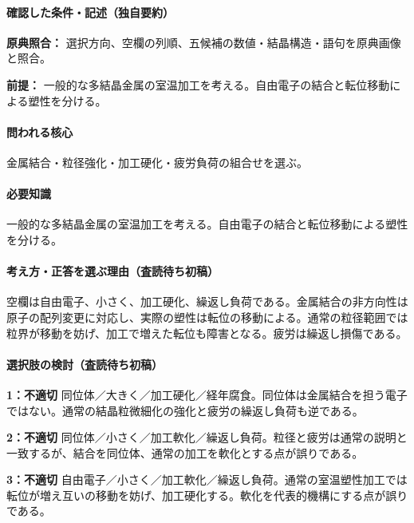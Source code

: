 \paragraph{確認した条件・記述（独自要約）}\mbox{}\par

\noindent\textbf{原典照合：} 選択方向、空欄の列順、五候補の数値・結晶構造・語句を原典画像と照合。\par

\noindent\textbf{前提：} 一般的な多結晶金属の室温加工を考える。自由電子の結合と転位移動による塑性を分ける。\par

\paragraph{問われる核心} 金属結合・粒径強化・加工硬化・疲労負荷の組合せを選ぶ。

\paragraph{必要知識} 一般的な多結晶金属の室温加工を考える。自由電子の結合と転位移動による塑性を分ける。

\paragraph{考え方・正答を選ぶ理由（査読待ち初稿）} 空欄は自由電子、小さく、加工硬化、繰返し負荷である。金属結合の非方向性は原子の配列変更に対応し、実際の塑性は転位の移動による。通常の粒径範囲では粒界が移動を妨げ、加工で増えた転位も障害となる。疲労は繰返し損傷である。

\paragraph{選択肢の検討（査読待ち初稿）}\mbox{}\par

\noindent\textbf{1：不適切} 同位体／大きく／加工硬化／経年腐食。同位体は金属結合を担う電子ではない。通常の結晶粒微細化の強化と疲労の繰返し負荷も逆である。\par

\noindent\textbf{2：不適切} 同位体／小さく／加工軟化／繰返し負荷。粒径と疲労は通常の説明と一致するが、結合を同位体、通常の加工を軟化とする点が誤りである。\par

\noindent\textbf{3：不適切} 自由電子／小さく／加工軟化／繰返し負荷。通常の室温塑性加工では転位が増え互いの移動を妨げ、加工硬化する。軟化を代表的機構にする点が誤りである。\par

